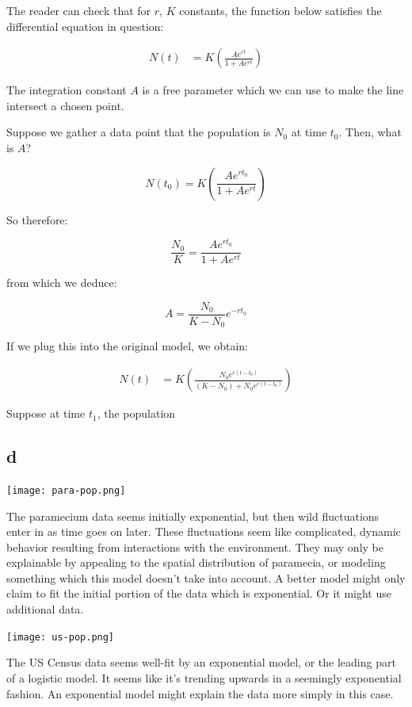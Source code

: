\documentclass{article}
\begin{document}
The reader can check that for $r$, $K$ constants, the function below
	satisfies the differential equation in question:

\begin{align}
		N(t) & = K \left( \frac{ A e^{r t}}{1 + A e^{r t}} \right)
\end{align}

The integration constant $A$ is a free parameter which we can use to make
	the line intersect a chosen point.

Suppose we gather a data point that the population is $N_0$ at time $t_0$.
Then, what is $A$?

\[ N(t_0) = K \left( \frac{ A e^{r t_0}}{1 + A e^{r t}} \right) \]

So therefore:

\[ \frac{N_0}{K} = \frac{ A e^{r t_0}}{1 + A e^{r t}} \]

from which we deduce:

\[ A = \frac{N_0}{K - N_0} e^{- r t_0} \]

If we plug this into the original model, we obtain:

\begin{align}
		N(t) & = K \left( \frac{N_0 e^{r(t-t_0)}}{(K - N_0) + N_0 e^{r (t-t_0)}} \right)
\end{align}

Suppose at time $t_1$, the population 


\subsection{d}

\texttt{[image: para-pop.png]}

The paramecium data seems initially exponential, but then wild fluctuations enter
	in as time goes on later.
These fluctuations seem like complicated, dynamic behavior resulting from interactions
	with the environment.
They may only be explainable by appealing to the spatial distribution of paramecia,
	or modeling something which this model doesn't take into account.
A better model might only claim to fit the initial portion of the data which is exponential.
Or it might use additional data.

\texttt{[image: us-pop.png]}

The US Census data seems well-fit by an exponential model, or the leading part of a logistic
	model.
It seems like it's trending upwards in a seemingly exponential fashion.
An exponential model might explain the data more simply in this case.
\end{document}

